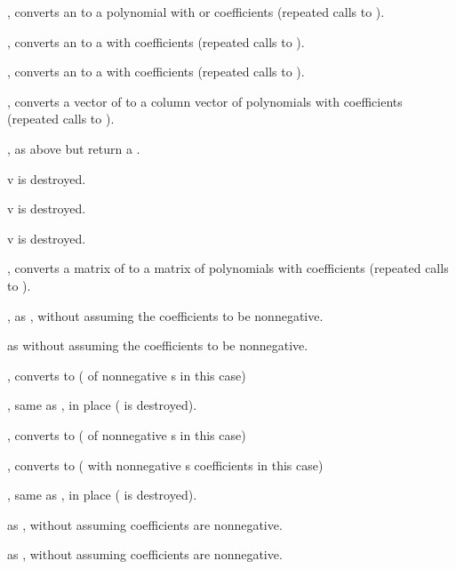 , converts an  to a polynomial with
 or  coefficients (repeated calls to ).

, converts an  to a  with
 coefficients (repeated calls to ).

, converts an  to a  with
 coefficients (repeated calls to ).

, converts a vector of  to a column
vector of polynomials with  coefficients (repeated calls to
).

, as above but return a .

 v is destroyed.

 v is destroyed.

 v is destroyed.

, converts a matrix of  to a matrix of
polynomials with  coefficients (repeated calls to ).

, as , without assuming
the coefficients to be nonnegative.

 as  without assuming
the coefficients to be nonnegative.

, converts to  ( of nonnegative
s in this case)

, same as , in place
( is destroyed).

, converts to  ( of nonnegative
s in this case)

, converts to  ( with
nonnegative s coefficients in this case)

, same as , in place
( is destroyed).

 as , without assuming
coefficients are nonnegative.

 as , without assuming
coefficients are nonnegative.

